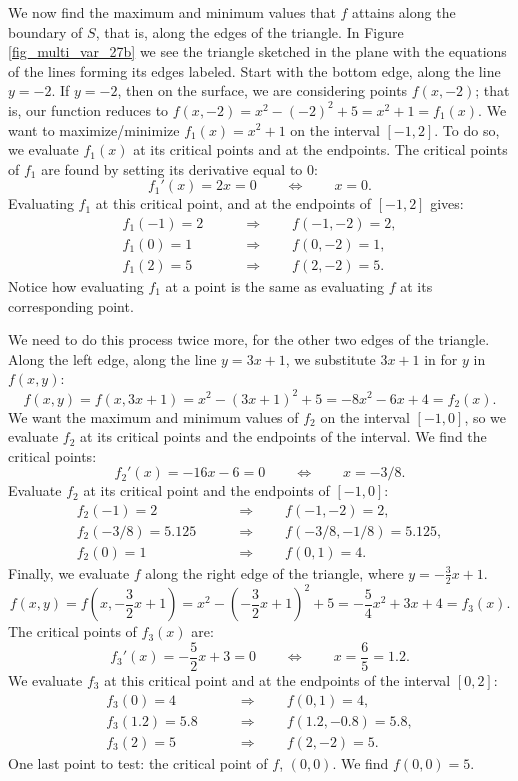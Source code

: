 \begin{example}
We now find the maximum and minimum values that $f$ attains along the boundary of $S$, that is, along the edges of the triangle. In Figure \ref{fig_multi_var_27b} we see the triangle sketched in the plane with the equations of the lines forming its edges labeled. Start with the bottom edge, along the line $y=-2$. If $y=-2$, then on the surface, we are considering points $f(x,-2)$; that is, our function reduces to $f(x,-2) = x^2-(-2)^2+5 = x^2+1=f_1(x)$. We want to maximize/minimize $f_1(x)=x^2+1$ on the interval $[-1,2]$. To do so, we evaluate $f_1(x)$ at its critical points and at the endpoints. The critical points of $f_1$ are found by setting its derivative equal to 0:
$$f_1'(x)= 2x = 0\qquad \Leftrightarrow \qquad x=0.$$
Evaluating $f_1$ at this critical point, and at the endpoints of $[-1,2]$ gives:
\begin{align*}
f_1(-1) = 2 \qquad&\Rightarrow\qquad f(-1,-2) = 2,\\
f_1(0) = 1 \qquad&\Rightarrow \qquad f(0,-2) = 1,\\
f_1(2) = 5 \qquad&\Rightarrow \qquad f(2,-2) = 5.
\end{align*}
Notice how evaluating $f_1$ at a point is the same as evaluating $f$ at its corresponding point.

We need to do this process twice more, for the other two edges of the triangle. Along the left edge, along the line $y=3x+1$, we substitute $3x+1$ in for $y$ in $f(x,y)$:
$$f(x,y) = f(x,3x+1) = x^2-(3x+1)^2+5 = -8x^2-6x+4 = f_2(x).$$
We want the maximum and minimum values of $f_2$ on the interval $[-1,0]$, so we evaluate $f_2$ at its critical points and the endpoints of the interval. We find the critical points:
$$f_2'(x) = -16x-6=0 \qquad \Leftrightarrow \qquad x=-3/8.$$
Evaluate $f_2$ at its critical point and the endpoints of $[-1,0]$:
\begin{align*}
f_2(-1) = 2 \qquad&\Rightarrow\qquad f(-1,-2) = 2,\\
f_2(-3/8) = 5.125  \qquad&\Rightarrow \qquad f(-3/8,-1/8) = 5.125,\\
f_2(0) = 1 \qquad&\Rightarrow \qquad f(0,1) = 4.
\end{align*}
Finally, we evaluate $f$ along the right edge of the triangle, where $y = -\frac{3}{2}x+1$. 
$$f(x,y) = f\left(x,-\frac{3}{2}x+1\right) = x^2-\left(-\frac{3}{2}x+1\right)^2+5 = -\frac54x^2+3x+4=f_3(x).$$
The critical points of $f_3(x)$ are:
$$f_3'(x) = -\frac{5}{2} x+3 = 0 \qquad \Leftrightarrow \qquad x=\frac{6}{5}=1.2.$$
We evaluate $f_3$ at this critical point and at the endpoints of the interval $[0,2]$:
\begin{align*}
f_3(0) = 4 \qquad&\Rightarrow\qquad f(0,1) = 4,\\
f_3(1.2) = 5.8  \qquad&\Rightarrow \qquad f(1.2,-0.8) = 5.8,\\
f_3(2) = 5 \qquad&\Rightarrow \qquad f(2,-2) = 5.
\end{align*}
One last point to test: the critical point of $f$, $(0,0)$. We find $f(0,0) = 5$.



\end{example}

